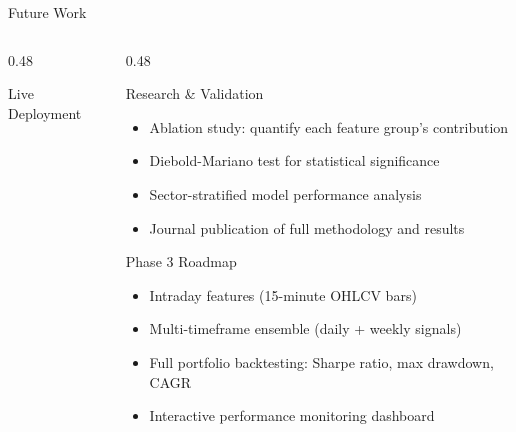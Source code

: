 \documentclass[aspectratio=43,11pt]{beamer}
\begin{document}
\begin{frame}[shrink=12]{Future Work}
\begin{columns}[T]
\begin{column}{0.48\textwidth}
\begin{block}{Live Deployment}
\begin{itemize}
                \end{itemize}
            \end{block}
        \end{column}
        \begin{column}{0.48\textwidth}
            \begin{block}{Research \& Validation}
                \footnotesize\setlength{\itemsep}{1pt}
                \begin{itemize}
                    \item Ablation study: quantify each feature group's contribution
                    \item Diebold-Mariano test for statistical significance
                    \item Sector-stratified model performance analysis
                    \item Journal publication of full methodology and results
                \end{itemize}
            \end{block}
            \begin{exampleblock}{Phase 3 Roadmap}
                \footnotesize\setlength{\itemsep}{1pt}
                \begin{itemize}
                    \item Intraday features (15-minute OHLCV bars)
                    \item Multi-timeframe ensemble (daily + weekly signals)
                    \item Full portfolio backtesting: Sharpe ratio, max drawdown, CAGR
                    \item Interactive performance monitoring dashboard
                \end{itemize}
            \end{exampleblock}
        \end{column}
    \end{columns}
\end{frame}
\end{document}
